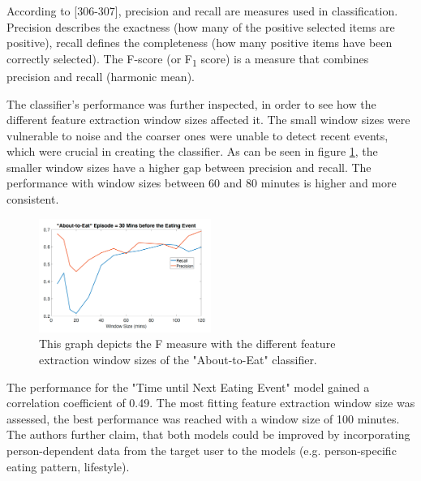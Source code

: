 According to \textcite{han2011data}[306-307], precision and recall are measures used in classification. Precision describes the exactness (how many of the positive selected items are positive), recall defines the completeness (how many positive items have been correctly selected). The F-score (or F\textsubscript{1} score) is a measure that combines precision and recall (harmonic mean).

The classifier's performance was further inspected, in order to see how the different feature extraction window sizes affected it. The small window sizes were vulnerable to noise and the coarser ones were unable to detect recent events, which were crucial in creating the classifier. As can be seen in figure \ref{figure:windowSize}, the smaller window sizes have a higher gap between precision and recall. The performance with window sizes between 60 and 80 minutes is higher and more consistent.

\begin{figure}[h]
  \centering
  \includegraphics[width=0.5\textwidth]{./images/windowSizePerformance.png}
  \caption{This graph depicts the F measure with the different feature extraction window sizes of the "About-to-Eat" classifier.}
  \label{figure:windowSize}
\end{figure}

The performance for the "Time until Next Eating Event" model gained a correlation coefficient of 0.49. The most fitting feature extraction window size was assessed, the best performance was reached with a window size of 100 minutes.
The authors further claim, that both models could be improved by incorporating person-dependent data from the target user to the models (e.g. person-specific eating pattern, lifestyle).




